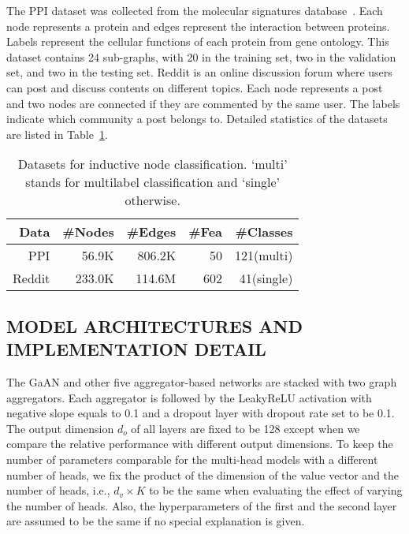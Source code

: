 \documentclass{article}
\begin{document}
	
	The PPI dataset was collected from the molecular signatures database~\citep{subramanian2005gene}. Each node represents a protein and edges represent the interaction between proteins. Labels represent the cellular functions of each protein from gene ontology. This dataset contains 24 sub-graphs, with 20 in the training set, two in the validation set, and two in the testing set. 
	Reddit is an online discussion forum where users can post and discuss contents on different topics. Each node represents a post and two nodes are connected if they are commented by the same user. 
	The labels indicate which community a post belongs to. Detailed statistics of the datasets are listed in Table~\ref{table:nc_dataset}.
	
	\begin{table}[!tb]
		\centering
		\caption{Datasets for inductive node classification. `multi' stands for multilabel classification and `single' otherwise.}
		\vskip -0.1in
		\begin{tabular}{r  rrrr }
			\hline
			\textbf{Data}  & \#\textbf{Nodes} & \#\textbf{Edges} & \#\textbf{Fea} & \#\textbf{Classes} \\
			\hline \hline
			PPI       & 56.9K  & 806.2K   & 50  & 121(multi)  \\  Reddit    & 233.0K & 114.6M & 602 & 41(single)   \\ \hline \end{tabular}
		\label{table:nc_dataset}
\end{table}
	
	\subsection{MODEL ARCHITECTURES AND IMPLEMENTATION DETAIL}
	The GaAN and other five aggregator-based networks are stacked with two graph aggregators. Each aggregator is followed by the LeakyReLU activation with negative slope equals to 0.1 and a dropout layer with dropout rate set to be 0.1. The output dimension $d_o$ of all layers are fixed to be 128 except when we compare the relative performance with different output dimensions. To keep the number of parameters comparable for the multi-head models with a different number of heads, we fix the product of the dimension of the value vector and the number of heads, i.e., $d_v \times K$ to be the same when evaluating the effect of varying the number of heads. Also, the hyperparameters of the first and the second layer are assumed to be the same if no special explanation is given.
\end{document}
